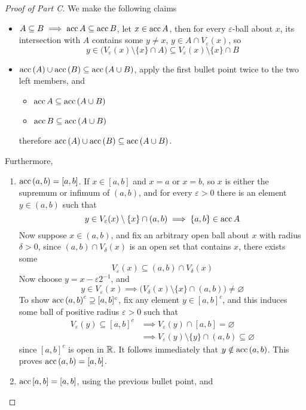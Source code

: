 \documentclass[../main.tex]{subfiles}
\begin{document}
\begin{proof}[Proof of Part C]
    We make the following claims
    \begin{itemize}
        \item $A\subseteq B\implies \operatorname{acc}{A}\subseteq \operatorname{acc}{B}$, let $x\in\operatorname{acc}{A}$, then for every $\varepsilon$-ball about $x$, its intersection with $A$ contains some $y\neq x$, $y\in A\cap V_\varepsilon(x)$, so
        \[y\in \biggl(V_\varepsilon(x)\setminus\{x\}\cap A\biggr)\subseteq V_\varepsilon(x)\setminus\{x\}\cap B\]
        \item $\operatorname{acc}{(A)}\cup\operatorname{acc}{(B)}\subseteq \operatorname{acc}{(A\cup B)}$, apply the first bullet point twice to the two left members, and
        \begin{itemize}
            \item $\operatorname{acc}{A}\subseteq\operatorname{acc}{(A\cup B)}$
            \item $\operatorname{acc}{B}\subseteq\operatorname{acc}{(A\cup B)}$
        \end{itemize}
        therefore $\operatorname{acc}{(A)}\cup\operatorname{acc}{(B)}\subseteq\operatorname{acc}{(A\cup B)}$.
    \end{itemize}
    Furthermore,
    \begin{enumerate}
        \item $\operatorname{acc}{(a,b)}=[a,b]$. If $x\in[a,b]$ and $x=a$ or $x=b$, so $x$ is either the supremum or infimum of $(a,b)$, and for every $\varepsilon>0$ there is an element $y\in(a,b)$ such that
        \[y\in V_\varepsilon(x)\setminus\{x\}\cap(a,b)\implies \{a,b\}\in \operatorname{acc}{A}\]
        Now suppose $x\in (a,b)$, and fix an arbitrary open ball about $x$ with radius $\delta>0$, since $(a,b)\cap V_\delta(x)$ is an open set that contains $x$, there exists some \[V_\varepsilon(x)\subseteq (a,b)\cap V_\delta(x)\]
        Now choose $y=x-\varepsilon2^{-1}$, and
        \[y\in V_\varepsilon(x)\implies \biggl(V_\delta(x)\setminus\{x\}\cap (a,b)\biggr)\neq\varnothing\]
        To show $\operatorname{acc}{(a,b)}^c\supseteq[a,b]^c$, fix any element $y\in[a,b]^c$, and this induces some ball of positive radius $\varepsilon>0$ such that
        \begin{align*}
        V_\varepsilon(y)\subseteq[a,b]^c&\implies V_\varepsilon(y)\cap[a,b]=\varnothing\\
        &\implies V_\varepsilon(y)\setminus\{y\}\cap(a,b)\subseteq\varnothing
        \end{align*}
        since $[a,b]^c$ is open in $\mathbb{R}$. It follows immediately that $y\notin \operatorname{acc}{(a,b)}$. This proves $\operatorname{acc}{(a,b)}=[a,b]$.
        \item $\operatorname{acc}{[a,b]}=[a,b]$, using the previous bullet point, and

\end{enumerate}
\end{proof}
\end{document}
